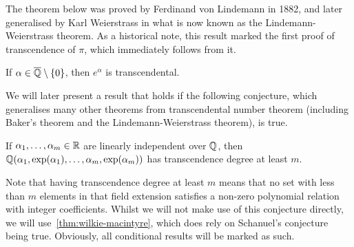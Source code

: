 
The theorem below was proved by Ferdinand von Lindemann in 1882, and later generalised by Karl Weierstrass in what is now known as the Lindemann-Weierstrass theorem. As a historical note, this result marked the first proof of transcendence of $\pi$, which immediately follows from it.

\begin{theorem}[Lindemann]
If $\alpha \in \overline{\mathbb{Q}} \setminus \lbrace 0 \rbrace$, then $e^{\alpha}$ is transcendental.
\end{theorem}

We will later present a result that holds if the following conjecture, which generalises many other theorems from transcendental number theorem (including Baker's theorem and the Lindemann-Weierstrass theorem), is true.

\begin{conjecture}[Schanuel]
  If $\alpha_{1}, \ldots, \alpha_{m} \in \mathbb{R}$ are linearly independent over $\mathbb{Q}$, then $\mathbb{Q}(\alpha_{1}, \exp(\alpha_{1}), \ldots, \alpha_{m}, \exp(\alpha_{m}))$ has transcendence degree at least $m$.
\end{conjecture}
Note that having transcendence degree at least $m$ means that no set with less than $m$ elements in that field extension satisfies a non-zero polynomial relation with integer coefficients. Whilst we will not make use of this conjecture directly, we will use~\cref{thm:wilkie-macintyre}, which does rely on Schanuel's conjecture being true. Obviously, all conditional results will be marked as such.
